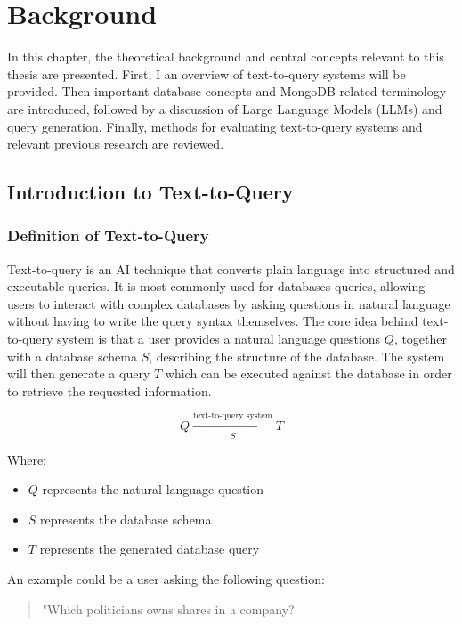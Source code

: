 \chapter{Background}
\label{ch:background}

In this chapter, the theoretical background and central concepts relevant to this thesis are presented. First, I an overview of text-to-query systems will be provided. Then 
important database concepts and MongoDB-related terminology are introduced, followed by a discussion of Large Language Models (LLMs) and query generation. Finally, methods for evaluating text-to-query systems and relevant previous research are reviewed.

\section{Introduction to Text-to-Query}

\subsection{Definition of Text-to-Query}

Text-to-query is an AI technique that converts plain language into structured and executable queries. It is most commonly used for databases queries, allowing users to interact with complex databases by asking questions in natural language without having to write the query syntax themselves. The core idea behind text-to-query system is that a user provides a natural language questions \(Q\), together with a database schema \(S\), describing the structure of the database. The system will then generate a query \(T\) which can be executed against the database in order to retrieve the requested information. 

\[
Q \xrightarrow[S]{\text{text-to-query system}} T
\]

Where:

\begin{itemize}
    \item \(Q\) represents the natural language question
    \item \(S\) represents the database schema
    \item \(T\) represents the generated database query
\end{itemize}

An example could be a user asking the following question:

\begin{quote}
    "Which politicians owns shares in a company?
\end{quote}

